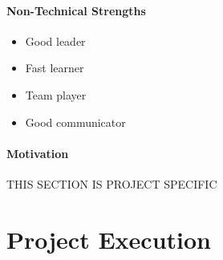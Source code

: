 \documentclass[english]{article}
\begin{document}
			\paragraph{Non-Technical Strengths}
			\begin{itemize}
				\setlength\itemsep{0.2em}
				\item Good leader
				\item Fast learner
				\item Team player
				\item Good communicator
			\end{itemize}
			
			\paragraph{Motivation}
			THIS SECTION IS PROJECT SPECIFIC
			
	\newpage
	\section{Project Execution}
\end{document}
